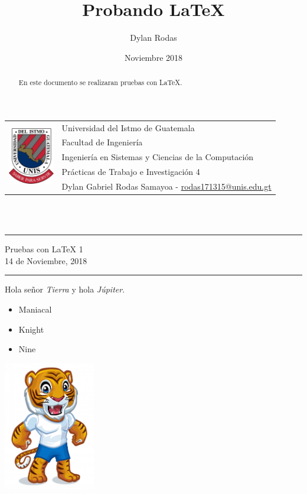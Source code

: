 \documentclass[10pt,a4paper]{article}
\title{Probando LaTeX}
\author{Dylan Rodas}
\date{Noviembre 2018}
\newcommand{\horrule}[1]{\rule{\linewidth}{#1}}
\begin{document}
\begin{tabular}{l l}
\multirow{5}{*}{\includegraphics[width=2cm]{Resources/Logo_UNIS.png}} & Universidad del Istmo de Guatemala \\
& Facultad de Ingeniería \\
& Ingeniería en Sistemas y Ciencias de la Computación \\
& Prácticas de Trabajo e Investigación 4 \\
& Dylan Gabriel Rodas Samayoa - \href{mailto:rodas171315@unis.edu.gt}{rodas171315@unis.edu.gt} \\
\end{tabular}
\\\    
	
\begin{center}
\horrule{1pt}
\huge{Pruebas con LaTeX 1} \\
\large{14 de Noviembre, 2018} \\
\horrule{1pt}
\end{center}

\begin{abstract}
En este documento se realizaran pruebas con LaTeX.
\end{abstract}

Hola se\~nor \emph{Tierra} y hola \emph{J\'upiter}. %

\begin{itemize}
\item Maniacal
\item Knight
\item Nine
\end{itemize}

\begin{center}
\includegraphics[width=4cm]{Resources/Tigre.jpg}
\end{center}
\end{document}
